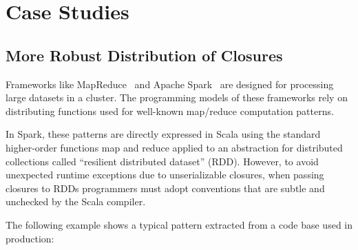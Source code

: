 \documentclass{llncs}
\begin{document}
\section{Case Studies}

\subsection{More Robust Distribution of Closures}

Frameworks like MapReduce~\cite{DeanG08} and Apache Spark~\cite{Spark} are designed for processing large datasets in a cluster. The programming models of these frameworks rely on distributing functions used for well-known map/reduce computation patterns.

In Spark, these patterns are directly expressed in Scala using the standard higher-order functions map and reduce applied to an abstraction for distributed collections called ``resilient distributed dataset'' (RDD). However, to avoid unexpected runtime exceptions due to unserializable closures, when passing closures to RDDs programmers must adopt conventions that are subtle and unchecked by the Scala compiler.

The following example shows a typical pattern extracted from a code base used in production:
\end{document}
